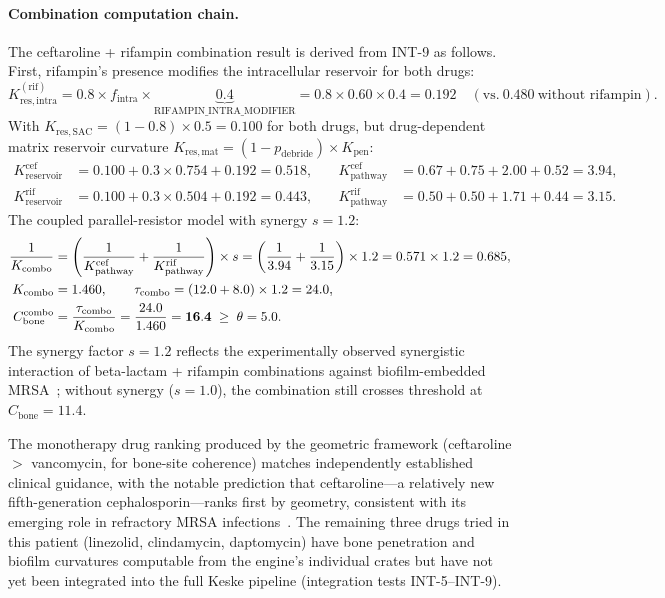 \documentclass[11pt]{article}
\theoremstyle{plain}
\theoremstyle{definition}
\newcommand{\Kpath}{K_{\mathrm{pathway}}}
\newcommand{\Kres}{K_{\mathrm{reservoir}}}
\begin{document}
\paragraph{Combination computation chain.}
\label{eq:combo-chain}
The ceftaroline + rifampin combination result is derived from INT-9
as follows. First, rifampin's presence modifies the intracellular
reservoir for both drugs:
\begin{equation}
  \label{eq:pseq-mod}
  K_{\mathrm{res,intra}}^{\mathrm{(rif)}} =
  0.8 \times f_{\mathrm{intra}} \times
  \underbrace{0.4}_{\text{RIFAMPIN\_INTRA\_MODIFIER}}
  = 0.8 \times 0.60 \times 0.4 = 0.192
  \quad (\text{vs.}\ 0.480\ \text{without rifampin}).
\end{equation}
With $K_{\mathrm{res,SAC}} = (1 - 0.8) \times 0.5 = 0.100$ for
both drugs, but drug-dependent matrix reservoir curvature
$K_{\mathrm{res,mat}} = (1 - p_{\mathrm{debride}}) \times
K_{\mathrm{pen}}$:
\label{eq:k-reservoir-detail}
\begin{align}
  \Kres^{\mathrm{cef}} &= 0.100 + 0.3 \times 0.754 + 0.192 = 0.518,
  &\quad \Kpath^{\mathrm{cef}} &= 0.67 + 0.75 + 2.00 + 0.52 = 3.94, \\
  \Kres^{\mathrm{rif}} &= 0.100 + 0.3 \times 0.504 + 0.192 = 0.443,
  &\quad \Kpath^{\mathrm{rif}} &= 0.50 + 0.50 + 1.71 + 0.44 = 3.15.
\end{align}
The coupled parallel-resistor model with synergy $s = 1.2$:
\begin{align}
  \frac{1}{K_{\mathrm{combo}}} &= \left(
    \frac{1}{\Kpath^{\mathrm{cef}}} + \frac{1}{\Kpath^{\mathrm{rif}}}
  \right) \times s
  = \left(\frac{1}{3.94} + \frac{1}{3.15}\right) \times 1.2
  = 0.571 \times 1.2 = 0.685, \notag \\
  K_{\mathrm{combo}} &= 1.460, \qquad
  \tau_{\mathrm{combo}} = (12.0 + 8.0) \times 1.2 = 24.0, \notag \\
  C_{\mathrm{bone}}^{\mathrm{combo}} &=
    \frac{\tau_{\mathrm{combo}}}{K_{\mathrm{combo}}}
    = \frac{24.0}{1.460} = \mathbf{16.4} \;\geq\; \theta = 5.0.
    \label{eq:combo-result}
\end{align}
The synergy factor $s = 1.2$ reflects the experimentally observed
synergistic interaction of beta-lactam + rifampin combinations
against biofilm-embedded MRSA~\cite{Barber2015}; without synergy
($s = 1.0$), the combination still crosses threshold at
$C_{\mathrm{bone}} = 11.4$.

The monotherapy drug ranking produced by the geometric framework
(ceftaroline $>$ vancomycin, for bone-site coherence) matches
independently established clinical guidance, with the notable prediction
that ceftaroline---a relatively new fifth-generation cephalosporin---ranks
first by geometry, consistent with its emerging role in refractory
MRSA infections~\cite{Barber2015}. The remaining three drugs tried in
this patient (linezolid, clindamycin, daptomycin) have bone penetration
and biofilm curvatures computable from the engine's individual crates
but have not yet been integrated into the full Keske pipeline
(integration tests INT-5--INT-9).
\end{document}

